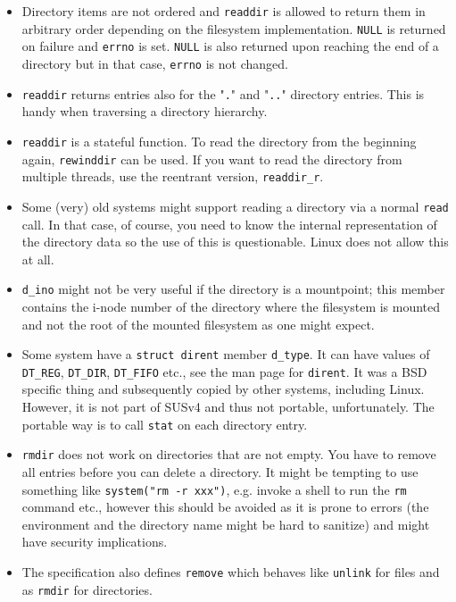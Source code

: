\begin{itemize}
\item Directory items are not ordered and
\texttt{readdir} is allowed to return them in arbitrary order depending on the
filesystem implementation.  \texttt{NULL} is returned on failure
and \texttt{errno} is set.  \texttt{NULL} is also returned upon reaching the end
of a directory but in that case, \texttt{errno} is not changed.
\item \texttt{readdir} returns entries also for the "\texttt{.}" and
"\texttt{..}" directory entries. This is handy when traversing a directory hierarchy.
\item \texttt{readdir} is a stateful function.  To read the directory from the
beginning again, \texttt{rewinddir} can be used.  If you want to read the
directory from multiple threads, use the reentrant version, \texttt{readdir\_r}.
\item Some (very) old systems might support reading a directory via a normal
\texttt{read} call.  In that case, of course, you need to know the internal
representation of the directory data so the use of this is questionable.  Linux
does not allow this at all.
\item \texttt{d\_ino} might not be very useful if the directory is a
mountpoint; this member contains the i-node number of the directory where the
filesystem is mounted and not the root of the mounted filesystem as one might
expect.
\item {} Some system have a \texttt{struct dirent} member
\texttt{d\_type}.  It can have values of \texttt{DT\_REG}, \texttt{DT\_DIR},
\texttt{DT\_FIFO} etc., see the man page for \texttt{dirent}.  It was a BSD
specific thing and subsequently copied by other systems, including Linux.
However, it is not part of SUSv4 and thus not portable, unfortunately.
The portable way is to call \texttt{stat} on each directory entry.
\item \texttt{rmdir} does not work on directories that are not empty.  You have
to remove all entries before you can delete a directory.  It might be tempting
to use something like \texttt{system("rm -r xxx")}, e.g. invoke a shell to
run the \texttt{rm} command etc., however this should be avoided as it is prone
to errors (the environment and the directory name might be hard to sanitize)
and might have security implications.
\item {} The specification also defines \texttt{remove} which
behaves like \texttt{unlink} for files and as \texttt{rmdir} for directories.
\end{itemize}

